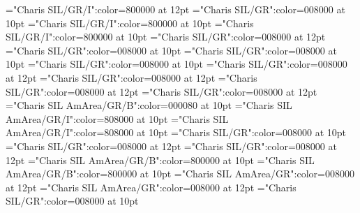 \documentclass[a4paper,twoside]{article}
\begin{document}
\font\partofspeechmorphosyntaxanalysissensesensecontentsensesentryletDatadicBody="Charis SIL/GR/I":color=800000 at 12pt
\font\spanespartofspeechmorphosyntaxanalysissensesensecontentsensesentryletDatadicBody="Charis SIL/GR":color=008000 at 10pt
\font\spanspanespartofspeechmorphosyntaxanalysissensesensecontentsensesentryletDatadicBody="Charis SIL/GR/I":color=800000 at 10pt
\font\spanpartofspeechmorphosyntaxanalysissensesensecontentsensesentryletDatadicBody="Charis SIL/GR/I":color=800000 at 10pt
\font{}="Charis SIL/GR":color=008000 at 12pt
\font\spanesdefinitionsensesensecontentsensesentryletDatadicBody="Charis SIL/GR":color=008000 at 10pt
\font\spanspanesdefinitionsensesensecontentsensesentryletDatadicBody="Charis SIL/GR":color=008000 at 10pt
\font\spandefinitionsensesensecontentsensesentryletDatadicBody="Charis SIL/GR":color=008000 at 10pt
\font\pictureentryletDatadicBody="Charis SIL/GR":color=008000 at 12pt
\font\thumbnailpictureentryletDatadicBody="Charis SIL/GR":color=008000 at 12pt
\font\captionContentpictureentryletDatadicBody="Charis SIL/GR":color=008000 at 12pt
\font\captioncaptionContentpictureentryletDatadicBody="Charis SIL/GR":color=008000 at 12pt
\font\spanmxbcaptioncaptionContentpictureentryletDatadicBody="Charis SIL AmArea/GR/B":color=000080 at 10pt
\font\comentariorestrictivosensesensecontentsensesentryletDatadicBody="Charis SIL AmArea/GR/I":color=808000 at 10pt
\font\spancomentariorestrictivosensesensecontentsensesentryletDatadicBody="Charis SIL AmArea/GR/I":color=808000 at 10pt
\font\spanescomentariorestrictivosensesensecontentsensesentryletDatadicBody="Charis SIL/GR":color=008000 at 10pt
\font\mainentrysubsensessensessensesensecontentsensesentryletDatadicBody="Charis SIL/GR":color=008000 at 12pt
\font\sensecontentmainentrysubsensessensessensesensecontentsensesentryletDatadicBody="Charis SIL/GR":color=008000 at 12pt
\font\sensenumbersensecontentmainentrysubsensessensessensesensecontentsensesentryletDatadicBody="Charis SIL AmArea/GR/B":color=800000 at 10pt
\font\spansensenumbersensecontentmainentrysubsensessensessensesensecontentsensesentryletDatadicBody="Charis SIL AmArea/GR/B":color=800000 at 10pt
\font\mainentrysubsensesensesensecontentmainentrysubsensessensessensesensecontentsensesentryletDatadicBody="Charis SIL AmArea/GR":color=008000 at 12pt
\font{}="Charis SIL AmArea/GR":color=008000 at 12pt
\font\spanesdefinitionorglossmainentrysubsensesensesensecontentmainentrysubsensessensessensesensecontentsensesentryletDatadicBody="Charis SIL/GR":color=008000 at 10pt
\end{document}
